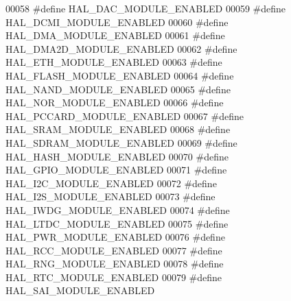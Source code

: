 \begin{DoxyCode}
00058 \textcolor{preprocessor}{#}\textcolor{preprocessor}{define} \textcolor{preprocessor}{HAL\_DAC\_MODULE\_ENABLED}
00059 \textcolor{preprocessor}{#}\textcolor{preprocessor}{define} \textcolor{preprocessor}{HAL\_DCMI\_MODULE\_ENABLED}
00060 \textcolor{preprocessor}{#}\textcolor{preprocessor}{define} \textcolor{preprocessor}{HAL\_DMA\_MODULE\_ENABLED}
00061 \textcolor{preprocessor}{#}\textcolor{preprocessor}{define} \textcolor{preprocessor}{HAL\_DMA2D\_MODULE\_ENABLED}
00062 \textcolor{preprocessor}{#}\textcolor{preprocessor}{define} \textcolor{preprocessor}{HAL\_ETH\_MODULE\_ENABLED}
00063 \textcolor{preprocessor}{#}\textcolor{preprocessor}{define} \textcolor{preprocessor}{HAL\_FLASH\_MODULE\_ENABLED}
00064 \textcolor{preprocessor}{#}\textcolor{preprocessor}{define} \textcolor{preprocessor}{HAL\_NAND\_MODULE\_ENABLED}
00065 \textcolor{preprocessor}{#}\textcolor{preprocessor}{define} \textcolor{preprocessor}{HAL\_NOR\_MODULE\_ENABLED}
00066 \textcolor{preprocessor}{#}\textcolor{preprocessor}{define} \textcolor{preprocessor}{HAL\_PCCARD\_MODULE\_ENABLED}
00067 \textcolor{preprocessor}{#}\textcolor{preprocessor}{define} \textcolor{preprocessor}{HAL\_SRAM\_MODULE\_ENABLED}
00068 \textcolor{preprocessor}{#}\textcolor{preprocessor}{define} \textcolor{preprocessor}{HAL\_SDRAM\_MODULE\_ENABLED}
00069 \textcolor{preprocessor}{#}\textcolor{preprocessor}{define} \textcolor{preprocessor}{HAL\_HASH\_MODULE\_ENABLED}
00070 \textcolor{preprocessor}{#}\textcolor{preprocessor}{define} \textcolor{preprocessor}{HAL\_GPIO\_MODULE\_ENABLED}
00071 \textcolor{preprocessor}{#}\textcolor{preprocessor}{define} \textcolor{preprocessor}{HAL\_I2C\_MODULE\_ENABLED}
00072 \textcolor{preprocessor}{#}\textcolor{preprocessor}{define} \textcolor{preprocessor}{HAL\_I2S\_MODULE\_ENABLED}
00073 \textcolor{preprocessor}{#}\textcolor{preprocessor}{define} \textcolor{preprocessor}{HAL\_IWDG\_MODULE\_ENABLED}
00074 \textcolor{preprocessor}{#}\textcolor{preprocessor}{define} \textcolor{preprocessor}{HAL\_LTDC\_MODULE\_ENABLED}
00075 \textcolor{preprocessor}{#}\textcolor{preprocessor}{define} \textcolor{preprocessor}{HAL\_PWR\_MODULE\_ENABLED}
00076 \textcolor{preprocessor}{#}\textcolor{preprocessor}{define} \textcolor{preprocessor}{HAL\_RCC\_MODULE\_ENABLED}
00077 \textcolor{preprocessor}{#}\textcolor{preprocessor}{define} \textcolor{preprocessor}{HAL\_RNG\_MODULE\_ENABLED}
00078 \textcolor{preprocessor}{#}\textcolor{preprocessor}{define} \textcolor{preprocessor}{HAL\_RTC\_MODULE\_ENABLED}
00079 \textcolor{preprocessor}{#}\textcolor{preprocessor}{define} \textcolor{preprocessor}{HAL\_SAI\_MODULE\_ENABLED}

\end{DoxyCode}
